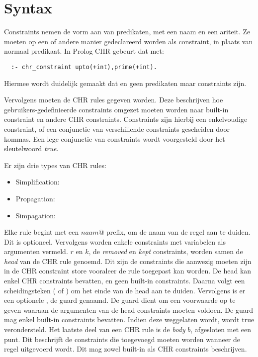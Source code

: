 \section{Syntax}

Constraints nemen de vorm aan van predikaten, met een naam en een ariteit. Ze moeten op een of andere manier gedeclareerd worden als constraint, in plaats van normaal predikaat. In Prolog CHR gebeurt dat met: \begin{Verbatim}
  :- chr_constraint upto(+int),prime(+int).
\end{Verbatim}
Hiermee wordt duidelijk gemaakt dat  en  geen predikaten maar constraints zijn.

Vervolgens moeten de CHR rules gegeven worden. Deze beschrijven hoe gebruikers-gedefinieerde constraints omgezet moeten worden naar built-in constraint en andere CHR constraints. Constraints zijn hierbij een enkelvoudige constraint, of een conjunctie van verschillende constraints gescheiden door kommas. Een lege conjunctie van constraints wordt voorgesteld door het sleutelwoord {\em true}. 

Er zijn drie types van CHR rules: \begin{itemize}
\item Simplification: 
\item Propagation: 
\item Simpagation: 
\end{itemize}
Elke rule begint met een $ naam @ $ prefix, om de naam van de regel aan te duiden. Dit is optioneel. Vervolgens worden enkele constraints met variabelen als argumenten vermeld. $r$ en $k$, de {\em removed} en {\em kept} constraints, worden samen de {\em head} van de CHR rule genoemd. Dit zijn de constraints die aanwezig moeten zijn in de CHR constraint store vooraleer de rule toegepast kan worden. De head kan enkel CHR constraints bevatten, en geen built-in constraints. Daarna volgt een scheidingsteken (\code{<=>} of \code{==>}) om het einde van de head aan te duiden. Vervolgens is er een optionele , de guard genaamd. De guard dient om een voorwaarde op te geven waaraan de argumenten van de head constraints moeten voldoen. De guard mag enkel built-in constraints bevatten. Indien deze weggelaten wordt, wordt true verondersteld. Het laatste deel van een CHR rule is de {\em body} $b$, afgesloten met een punt. Dit beschrijft de constraints die toegevoegd moeten worden wanneer de regel uitgevoerd wordt. Dit mag zowel built-in als CHR constraints beschrijven.

